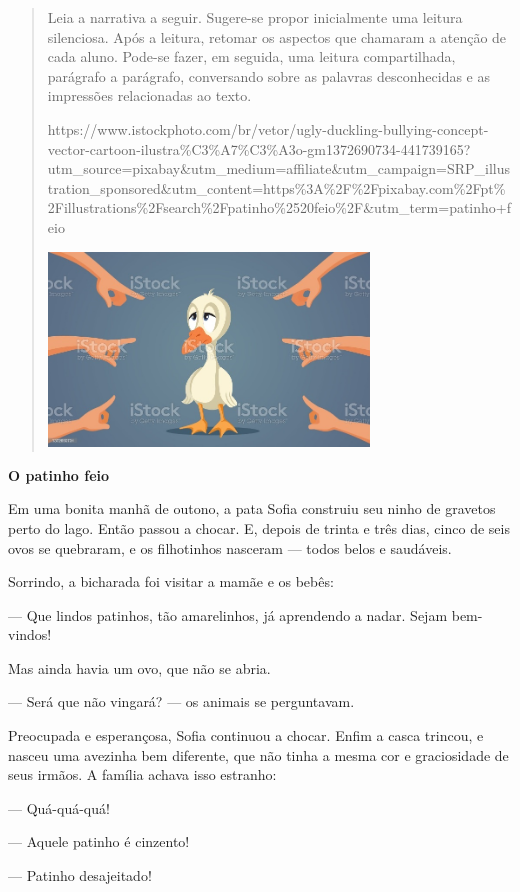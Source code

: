 \begin{itemize}
{{{\begin{itemize}
\begin{itemize}
\begin{itemize}
\begin{quote}
Leia a narrativa a seguir. Sugere-se propor inicialmente uma leitura
silenciosa. Após a leitura, retomar os aspectos que chamaram a atenção
de cada aluno. Pode-se fazer, em seguida, uma leitura compartilhada,
parágrafo a parágrafo, conversando sobre as palavras desconhecidas e as
impressões relacionadas ao texto.

https://www.istockphoto.com/br/vetor/ugly-duckling-bullying-concept-vector-cartoon-ilustra\%C3\%A7\%C3\%A3o-gm1372690734-441739165?utm\_source=pixabay\&utm\_medium=affiliate\&utm\_campaign=SRP\_illustration\_sponsored\&utm\_content=https\%3A\%2F\%2Fpixabay.com\%2Fpt\%2Fillustrations\%2Fsearch\%2Fpatinho\%2520feio\%2F\&utm\_term=patinho+feio

\includegraphics[width=3.35140in,height=2.03748in]{media/image36.jpeg}
\end{quote}

\textbf{O patinho feio}

Em uma bonita manhã de outono, a pata Sofia construiu seu ninho de
gravetos perto do lago. Então passou a chocar. E, depois de trinta e
três dias, cinco de seis ovos se quebraram, e os filhotinhos nasceram
--- todos belos e saudáveis.

Sorrindo, a bicharada foi visitar a mamãe e os bebês:

--- Que lindos patinhos, tão amarelinhos, já aprendendo a nadar. Sejam
bem-vindos!

Mas ainda havia um ovo, que não se abria.

--- Será que não vingará? --- os animais se perguntavam.

Preocupada e esperançosa, Sofia continuou a chocar. Enfim a casca
trincou, e nasceu uma avezinha bem diferente, que não tinha a mesma cor
e graciosidade de seus irmãos. A família achava isso estranho:

--- Quá-quá-quá!

--- Aquele patinho é cinzento!

--- Patinho desajeitado!


\end{itemize}
\end{itemize}
\end{itemize}}}}
\end{itemize}
